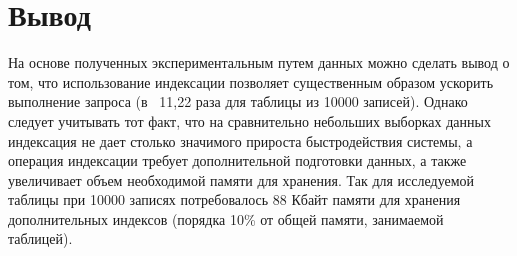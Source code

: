 \section*{Вывод}

На основе полученных экспериментальным путем данных можно сделать вывод о том, что использование индексации позволяет существенным образом ускорить выполнение запроса (в ~11,22 раза для таблицы из 10000 записей). Однако следует учитывать тот факт, что на сравнительно небольших выборках данных индексация не дает столько значимого прироста быстродействия системы, а операция индексации требует дополнительной подготовки данных, а также увеличивает объем необходимой памяти для хранения. Так для исследуемой таблицы при 10000 записях потребовалось 88 Кбайт памяти для хранения дополнительных индексов (порядка 10\% от общей памяти, занимаемой таблицей).